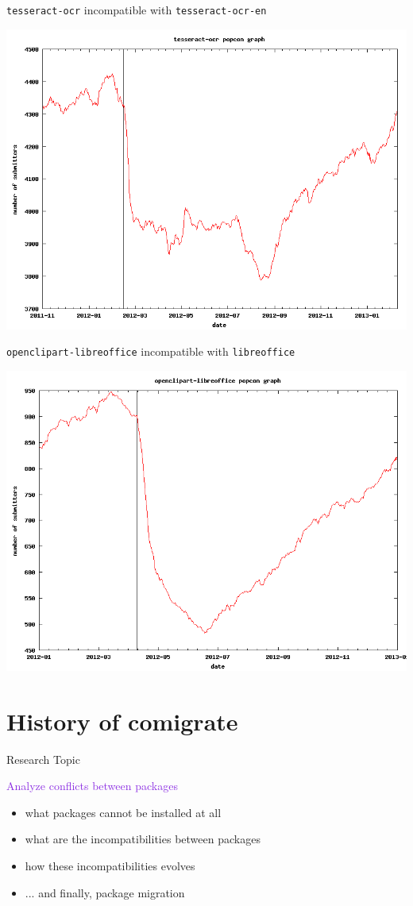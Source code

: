 \documentclass[xcolor={dvipsnames}]{beamer}
\newcommand{\EEE}[1]{\textcolor{BlueViolet}{#1}}
\begin{document}
\begin{frame}
\texttt{tesseract-ocr} incompatible with \texttt{tesseract-ocr-en}
\begin{center}
\includegraphics[width=0.8\linewidth]{tesseract-ocr}
\end{center}
\end{frame}

\begin{frame}
\texttt{openclipart-libreoffice} incompatible with \texttt{libreoffice}
\begin{center}
\includegraphics[width=0.8\linewidth]{openclipart-libreoffice}
\end{center}
\end{frame}

\part{History of comigrate}
\frame{\partpage}

\begin{frame}{Research Topic}

\EEE{Analyze conflicts between packages}
\begin{itemize}
\item what packages cannot be installed at all
\item what are the incompatibilities between packages
\item how these incompatibilities evolves
\item ... and finally, package migration
\end{itemize}

\end{frame}
\end{document}
